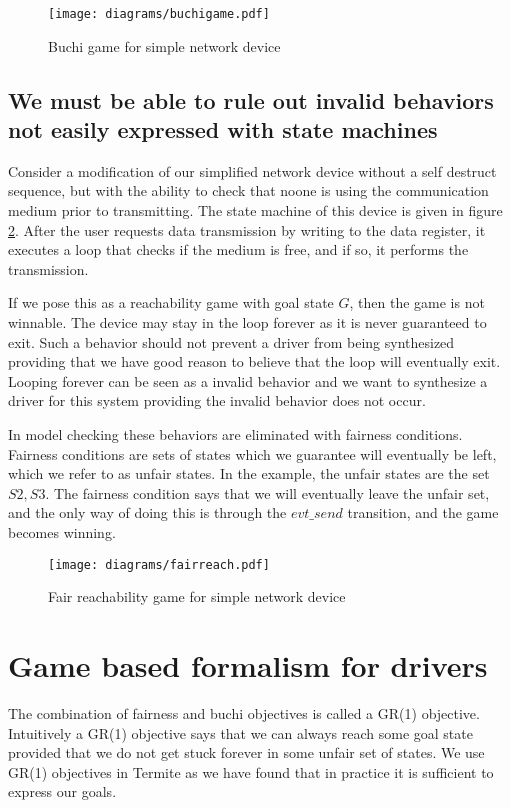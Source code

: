 \documentclass{book}
\theoremstyle{definition}
\begin{document}
\begin{figure}[t]
\centering
\texttt{[image: diagrams/buchigame.pdf]}
\caption{Buchi game for simple network device}
\label{fig:buchi}
\end{figure}

\subsection{We must be able to rule out invalid behaviors not easily expressed with state machines}

Consider a modification of our simplified network device without a self destruct sequence, but with the ability to check that noone is using the communication medium prior to transmitting. The state machine of this device is given in figure \ref{fig:fair}. After the user requests data transmission by writing to the data register, it executes a loop that checks if the medium is free, and if so, it performs the transmission. 

If we pose this as a reachability game with goal state $G$, then the game is not winnable. The device may stay in the loop forever as it is never guaranteed to exit. Such a behavior should not prevent a driver from being synthesized providing that we have good reason to believe that the loop will eventually exit. Looping forever can be seen as a invalid behavior and we want to synthesize a driver for this system providing the invalid behavior does not occur. 

In model checking these behaviors are eliminated with fairness conditions. Fairness conditions are sets of states which we guarantee will eventually be left, which we refer to as unfair states. In the example, the unfair states are the set ${S2, S3}$. The fairness condition says that we will eventually leave the unfair set, and the only way of doing this is through the $evt\_send$ transition, and the game becomes winning.

\begin{figure}[t]
\centering
\texttt{[image: diagrams/fairreach.pdf]}
\caption{Fair reachability game for simple network device}
\label{fig:fair}
\end{figure}

\section{Game based formalism for drivers}

The combination of fairness and buchi objectives is called a GR(1) objective. Intuitively a GR(1) objective says that we can always reach some goal state provided that we do not get stuck forever in some unfair set of states. We use GR(1) objectives in Termite as we have found that in practice it is sufficient to express our goals.
\end{document}
